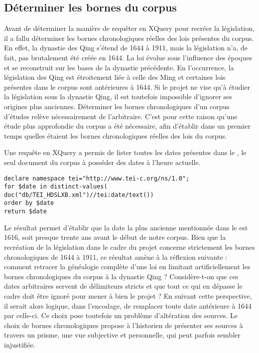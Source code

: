 \subsection{Déterminer les bornes du corpus}

Avant de déterminer la manière de requêter en XQuery pour recréer la législation, il a fallu déterminer les bornes chronologiques réelles des lois présentes du corpus. En effet, la dynastie des Qing s'étend de 1644 à 1911, mais la législation n'a, de fait, pas brutalement été créée en 1644. La loi évolue sous l'influence des époques et se reconstruit sur les bases de la dynastie précédente. En l'occurrence, la législation des Qing est étroitement liée à celle des Ming et certaines lois présentes dans le corpus sont antérieures à 1644. Si le projet \COREL ne vise qu'à étudier la législation sous la dynastie Qing, il est toutefois impossible d'ignorer ses origines plus anciennes. Déterminer les bornes chronologiques d'un corpus d'études relève nécessairement de l'arbitraire. C'est pour cette raison qu'une étude plus approfondie du corpus a été nécessaire, afin d'établir dans un premier temps quelles étaient les bornes chronologiques réelles des lois du corpus. 

Une requête en XQuery a permis de lister toutes les dates présentes dans le \huidian, le seul document du corpus à posséder des dates à l'heure actuelle. 
\bigskip
\begin{verbatim}
declare namespace tei="http://www.tei-c.org/ns/1.0";
for $date in distinct-values( doc("db/TEI_HDSLXB.xml")//tei:date/text())
order by $date
return $date
\end{verbatim}
\bigskip
Le résultat permet d'établir que la date la plus ancienne mentionnée dans le \huidian est 1616, soit presque trente ans avant le début de notre corpus. Bien que la recréation de la législation dans le cadre du projet \COREL concerne strictement les bornes chronologiques de 1644 à 1911, ce résultat amène à la réflexion suivante : comment retracer la généalogie complète d'une loi en limitant artificiellement les bornes chronologiques du corpus à la dynastie Qing ? Considère-t-on que ces dates arbitraires servent de délimiteurs stricts et que tout ce qui en dépasse le cadre doit être ignoré pour mener à bien le projet ? En suivant cette perspective, il serait alors logique, dans l'encodage, de remplacer toute date antérieure à 1644 par celle-ci. Ce choix pose toutefois un problème d'altération des sources. Le choix de bornes chronologiques propose à l'historien de présenter ses sources à travers un prisme, une vue subjective et personnelle, qui peut parfois sembler injustifiée.

